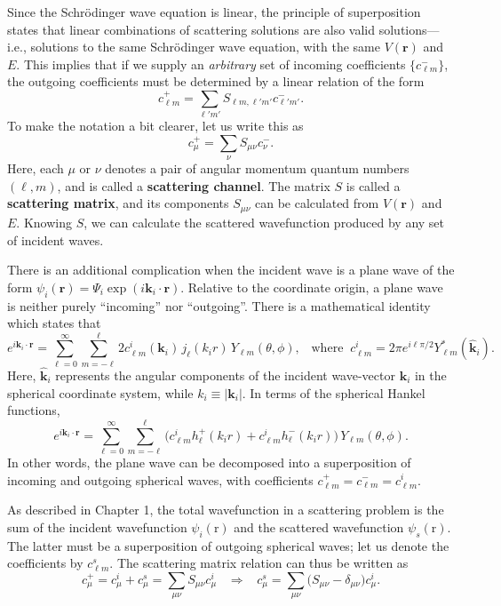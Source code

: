 \documentclass[pra,12pt]{revtex4}
\begin{document}
Since the Schr\"odinger wave equation is linear, the principle of
superposition states that linear combinations of scattering solutions
are also valid solutions---i.e., solutions to the same Schr\"odinger
wave equation, with the same $V(\mathbf{r})$ and $E$.  This implies
that if we supply an \textit{arbitrary} set of incoming coefficients
$\{c_{\ell m}^-\}$, the outgoing coefficients must be determined by a
linear relation of the form
$$c_{\ell m}^+ = \sum_{\ell'm'} S_{\ell m, \ell' m'} c_{\ell' m'}^-.$$
To make the notation a bit clearer, let us write this as
$$c_{\mu}^+ = \sum_{\nu} S_{\mu \nu} c_{\nu}^-.$$
Here, each $\mu$ or $\nu$ denotes a pair of angular momentum quantum
numbers $(\ell,m)$, and is called a \textbf{scattering channel}.  The
matrix $S$ is called a \textbf{scattering matrix}, and its components
$S_{\mu\nu}$ can be calculated from $V(\mathbf{r})$ and $E$.  Knowing
$S$, we can calculate the scattered wavefunction produced by any set
of incident waves.

There is an additional complication when the incident wave is a plane
wave of the form $\psi_i(\mathbf{r}) = \Psi_i \exp(i\mathbf{k}_i\cdot
\mathbf{r})$.  Relative to the coordinate origin, a plane wave is
neither purely ``incoming'' nor ``outgoing''.  There is a mathematical
identity which states that
$$e^{i\mathbf{k}_i \cdot \mathbf{r}} = \sum_{\ell=0}^\infty \sum_{m=-\ell}^\ell 2c^i_{\ell m}(\mathbf{k}_i) \, j_{\ell}(k_ir) \, Y_{\ell m}(\theta,\phi), \;\;\;\mathrm{where}\;\;c^i_{\ell m} = 2\pi e^{i\ell\pi/2} Y_{\ell m}^*(\hat{\mathbf{k}}_i).$$
Here, $\hat{\mathbf{k}}_i$ represents the angular components of the
incident wave-vector $\mathbf{k}_i$ in the spherical coordinate
system, while $k_i \equiv |\mathbf{k}_i|$.  In terms of
the spherical Hankel functions,
$$e^{i\mathbf{k}_i \cdot \mathbf{r}} = \sum_{\ell=0}^\infty \sum_{m=-\ell}^\ell \Big(c^i_{\ell m} h_{\ell}^+(k_ir) + c^i_{\ell m} h_{\ell}^-(k_ir) \Big) \, Y_{\ell m}(\theta,\phi).$$
In other words, the plane wave can be decomposed into a superposition
of incoming and outgoing spherical waves, with coefficients $c_{\ell
  m}^+ = c_{\ell m}^- = c^i_{\ell m}$.

As described in Chapter 1, the total wavefunction in a scattering
problem is the sum of the incident wavefunction $\psi_i(\mathrm{r})$
and the scattered wavefunction $\psi_s(\mathrm{r})$.  The latter must
be a superposition of outgoing spherical waves; let us denote the
coefficients by $c^s_{\ell m}$.  The scattering matrix relation can
thus be written as
$$c^+_\mu = c^i_{\mu} + c^s_{\mu} = \sum_{\mu\nu} S_{\mu\nu} c^i_{\mu} \;\;\; \Rightarrow \;\;\; c^s_{\mu} = \sum_{\mu\nu} \Big(S_{\mu\nu} - \delta_{\mu\nu}\Big) c^i_{\mu}.$$
\end{document}
